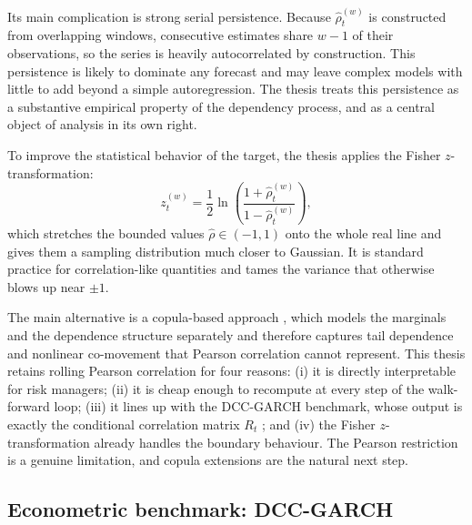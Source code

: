Its main complication is strong serial persistence. Because $\hat{\rho}_{t}^{(w)}$ is constructed from overlapping windows, consecutive estimates share $w-1$ of their observations, so the series is heavily autocorrelated by construction. This persistence is likely to dominate any forecast and may leave complex models with little to add beyond a simple autoregression. The thesis treats this persistence as a substantive empirical property of the dependency process, and as a central object of analysis in its own right.

To improve the statistical behavior of the target, the thesis applies the Fisher $z$-transformation:
\begin{equation}
    z_{t}^{(w)} = \frac{1}{2}\ln\!\left(\frac{1 + \hat{\rho}_{t}^{(w)}}{1 - \hat{\rho}_{t}^{(w)}}\right),
\end{equation}
which stretches the bounded values $\hat{\rho} \in (-1,1)$ onto the whole real line and gives them a sampling distribution much closer to Gaussian. It is standard practice for correlation-like quantities and tames the variance that otherwise blows up near $\pm 1$.

The main alternative is a copula-based approach \cite{patton2006copula}, which models the marginals and the dependence structure separately and therefore captures tail dependence and nonlinear co-movement that Pearson correlation cannot represent. This thesis retains rolling Pearson correlation for four reasons: (i) it is directly interpretable for risk managers; (ii) it is cheap enough to recompute at every step of the walk-forward loop; (iii) it lines up with the DCC-GARCH benchmark, whose output is exactly the conditional correlation matrix $R_t$ \cite{engle2001theoretical}; and (iv) the Fisher $z$-transformation already handles the boundary behaviour. The Pearson restriction is a genuine limitation, and copula extensions are the natural next step.

\subsection{Econometric benchmark: DCC-GARCH}

